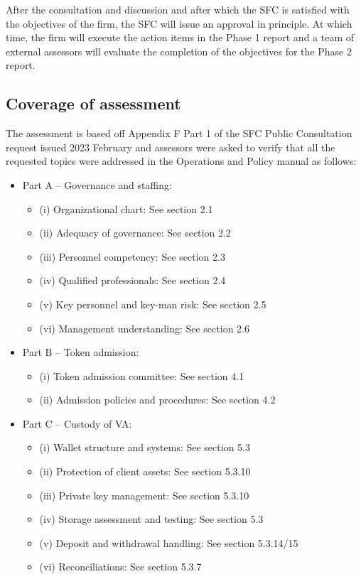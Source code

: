 \documentclass[]{report}
\begin{document}
After the consultation and discussion and after which the SFC is
satisfied with the objectives of the firm, the SFC will issue an
approval in principle.  At which time, the firm will execute the
action items in the Phase 1 report and a team of external assessors
will evaluate the completion of the objectives for the Phase 2 report.

\subsection{Coverage of assessment}
The assessment is based off Appendix F Part 1 of the SFC Public
Consultation request issued 2023 February and assessors were asked to
verify that all the requested topics were addressed in the
Operations and Policy manual as follows:
\begin{itemize}
\item Part A – Governance and staffing:
  \begin{itemize}
\item (i) Organizational chart: See section 2.1
\item (ii) Adequacy of governance: See section 2.2
\item (iii) Personnel competency: See section 2.3
\item (iv) Qualified professionals: See section 2.4
\item (v) Key personnel and key-man risk: See section 2.5
\item (vi) Management understanding: See section 2.6
\end{itemize}
\item Part B – Token admission:
\begin{itemize}
\item (i) Token admission committee: See section 4.1
\item (ii) Admission policies and procedures: See section 4.2
\end{itemize}

\item Part C – Custody of VA:
\begin{itemize}
\item (i) Wallet structure and systems: See section 5.3
\item (ii) Protection of client assets: See section 5.3.10
\item (iii) Private key management: See section 5.3.10
\item (iv) Storage assessment and testing: See section 5.3
\item (v) Deposit and withdrawal handling: See section 5.3.14/15
\item (vi) Reconciliations: See section 5.3.7
\end{itemize}


\end{itemize}
\end{document}

